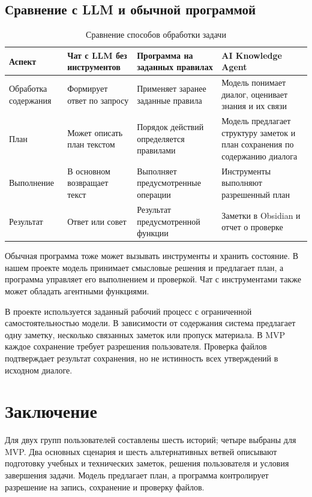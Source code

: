 \subsection{Сравнение с LLM и обычной программой}

\begin{table}[H]\centering\small
\caption{Сравнение способов обработки задачи}
\setlength{\tabcolsep}{4pt}\renewcommand{\arraystretch}{1.1}\setlength{\abovecaptionskip}{5pt}
\begin{tabularx}{\textwidth}{L{0.13\textwidth}YYY}
\toprule
\textbf{Аспект} & \textbf{Чат с LLM без инструментов} & \textbf{Программа на заданных правилах} & \textbf{AI Knowledge Agent} \\
\midrule
Обработка содержания & Формирует ответ по запросу & Применяет заранее заданные правила & Модель понимает диалог, оценивает знания и их связи \\[2pt]
План & Может описать план текстом & Порядок действий определяется правилами & Модель предлагает структуру заметок и план сохранения по содержанию диалога \\[2pt]
Выполнение & В основном возвращает текст & Выполняет предусмотренные операции & Инструменты выполняют разрешенный план \\[2pt]
Результат & Ответ или совет & Результат предусмотренной функции & Заметки в Obsidian и отчет о проверке \\[2pt]
\bottomrule\end{tabularx}\end{table}

Обычная программа тоже может вызывать инструменты и хранить состояние. В нашем проекте модель принимает смысловые решения и предлагает план, а программа управляет его выполнением и проверкой. Чат с инструментами также может обладать агентными функциями.


В проекте используется заданный рабочий процесс с ограниченной самостоятельностью модели. В зависимости от содержания система предлагает одну заметку, несколько связанных заметок или пропуск материала. В MVP каждое сохранение требует разрешения пользователя. Проверка файлов подтверждает результат сохранения, но не истинность всех утверждений в исходном диалоге.


\section{Заключение}

Для двух групп пользователей составлены шесть историй; четыре выбраны для MVP. Два основных сценария и шесть альтернативных ветвей описывают подготовку учебных и технических заметок, решения пользователя и условия завершения задачи. Модель предлагает план, а программа контролирует разрешение на запись, сохранение и проверку файлов.

